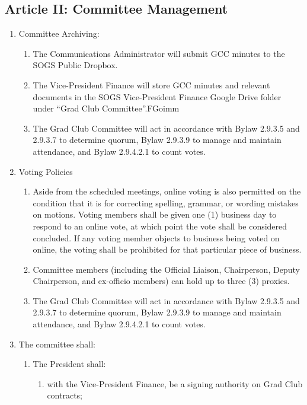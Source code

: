 \subsection{Article II: Committee Management}
\begin{enumerate}[label*=\arabic*., align=left]	
\item Committee Archiving:
\begin{enumerate}[label*=\arabic*., align=left]
\item The Communications Administrator will submit GCC minutes to the SOGS Public Dropbox.
\item The Vice-President Finance will store GCC minutes and relevant documents in the SOGS Vice-President Finance Google Drive folder under “Grad Club Committee”.FGoimm
\item The Grad Club Committee will act in accordance with Bylaw 2.9.3.5 and 2.9.3.7 to determine quorum, Bylaw 2.9.3.9 to manage and maintain attendance, and Bylaw 2.9.4.2.1 to count votes.
\end{enumerate}
\item Voting Policies
\begin{enumerate}[label*=\arabic*., align=left]	
\item Aside from the scheduled meetings, online voting is also permitted on the condition that it is for correcting spelling, grammar, or wording mistakes on motions. Voting members shall be given one (1) business day to respond to an online vote, at which point the vote shall be considered concluded. If any voting member objects to business being voted on online, the voting shall be prohibited for that particular piece of business.
\item Committee members (including the Official Liaison, Chairperson, Deputy Chairperson, and ex-officio members) can hold up to three (3) proxies.
\item The Grad Club Committee will act in accordance with Bylaw 2.9.3.5 and 2.9.3.7 to determine quorum, Bylaw 2.9.3.9 to manage and maintain attendance, and Bylaw 2.9.4.2.1 to count votes.
\end{enumerate}
\item The committee shall:
\begin{enumerate}[label*=\arabic*., align=left]
\item The President shall:
\begin{enumerate}[label*=\arabic*., align=left]
\item with the Vice-President Finance, be a signing authority on Grad Club contracts;

\end{enumerate}
\end{enumerate}
\end{enumerate}
